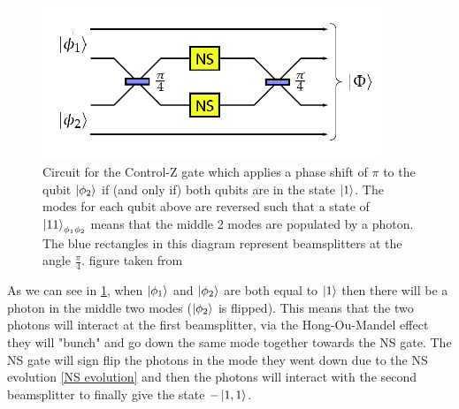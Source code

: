 \begin{figure}[h]
    \centering
    \includegraphics[width=0.9\textwidth]{images/CZ-gate.png}
    \caption{Circuit for the Control-Z gate which applies a phase shift of $\pi$ to the qubit $\ket{\phi_2}$ if (and only if) both qubits are in the state $\ket{1}$. The modes for each qubit above are reversed such that a state of $\ket{11}_{\phi_1\phi_2}$ means that the middle 2 modes are populated by a photon. The blue rectangles in this diagram represent beamsplitters at the angle $\frac{\pi}{4}$. figure taken from \cite{Kok:2005jip}}\label{fig:CZ_gate}
\end{figure}

As we can see in \cref{fig:CZ_gate}, when $\ket{\phi_1}$ and $\ket{\phi_2}$ are both equal to $\ket{1}$ then there will be a photon in the middle two modes ($\ket{\phi_2}$ is flipped). This means that the two photons will interact at the first beamsplitter, via the Hong-Ou-Mandel effect they will "bunch" and go down the same mode together towards the NS gate. The NS gate will sign flip the photons in the mode they went down due to the NS evolution \cref{NS evolution} and then the photons will interact with the second beamsplitter to finally give the state $-\ket{1,1}$.%

